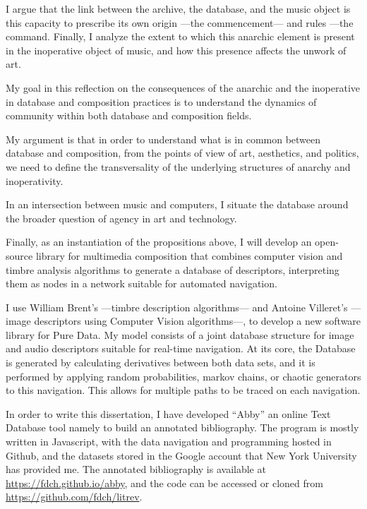 I argue that the link between the archive, the database, and the music object is this capacity to prescribe its own origin ---the commencement--- and rules ---the command. Finally, I analyze the extent to which this anarchic element is present in the inoperative object of music, and how this presence affects the unwork of art. 

My goal in this reflection on the consequences of the anarchic and the inoperative in database and composition practices is to understand the dynamics of community within both database and composition fields. 

My argument is that in order to understand what is in common between database and composition, from the points of view of art, aesthetics, and politics, we need to define the transversality of the underlying structures of anarchy and inoperativity.



In an intersection between music and computers, I situate the database around the broader question of agency in art and technology. 


Finally, as an instantiation of the propositions above, I will develop an open-source library for multimedia composition that combines computer vision and timbre analysis algorithms to generate a database of descriptors, interpreting them as nodes in a network suitable for automated navigation. 


I use William Brent's  ---timbre description algorithms--- and Antoine Villeret's  ---image descriptors using Computer Vision algorithms---, to develop a new software library for Pure Data. My model consists of a joint database structure for image and audio descriptors suitable for real-time navigation. At its core, the Database is generated by calculating derivatives between both data sets, and it is performed by applying random probabilities, markov chains, or chaotic generators to this navigation. This allows for multiple paths to be traced on each navigation.

In order to write this dissertation, I have developed ``Abby'' an online Text Database tool namely to build an annotated bibliography. The program is mostly written in Javascript, with the data navigation and programming hosted in Github, and the datasets stored in the Google account that New York University has provided me. The annotated bibliography is available at \url{https://fdch.github.io/abby}, and the code can be accessed or cloned from \url{https://github.com/fdch/litrev}.






